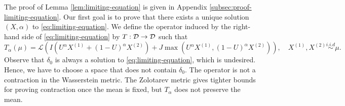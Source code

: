 The proof of Lemma \ref{lem:limiting-equation} is given in Appendix \ref{subsec:proof-limiting-equation}. Our first goal is to prove that there exists a unique solution $(X,\alpha)$ to \eqref{eq:limiting-equation}. We define the operator induced by the right-hand side of \eqref{eq:limiting-equation} by $T: \mathcal{D} \to \mathcal{D}$ such that
\begin{equation}
  T_{\alpha}(\mu) = \mathcal{L}\left(I\left(U^\alpha X^{(1)} + (1-U)^\alpha X^{(2)}\right) + J\max(U^\alpha X^{(1)}, (1-U)^\alpha X^{(2)})\right), \quad X^{(1)}, X^{(2)} \stackrel{i.i.d}{\sim}\mu.
\end{equation}
Observe that $\delta_0$ is always a solution to \eqref{eq:limiting-equation}, which is undesired. Hence, we have to choose a space that does not contain $\delta_0$. The operator is not a contraction in the Wasserstein metric. The Zolotarev metric \cite{zolotarev1977approximation} gives tighter bounds for proving contraction once the mean is fixed, but $T_\alpha$ does not preserve the mean.